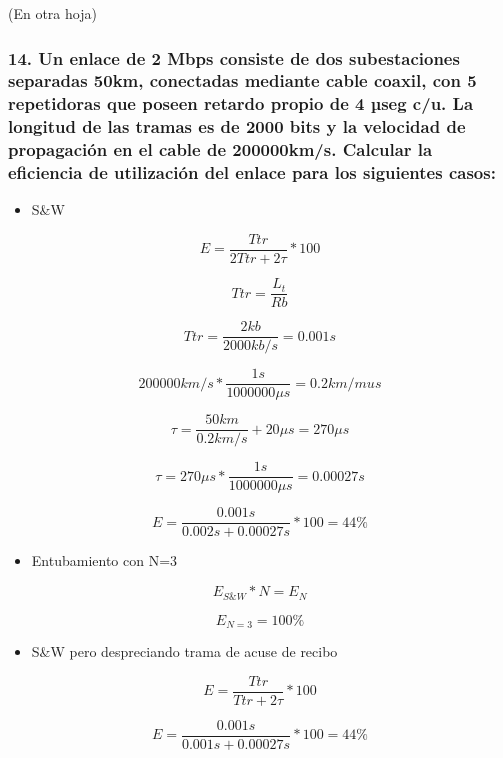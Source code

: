 \documentclass{article}
\begin{document}
(En otra hoja)

\subsubsection{14. Un enlace de 2 Mbps consiste de dos subestaciones
separadas 50km, conectadas mediante cable coaxil, con 5 repetidoras que
poseen retardo propio de 4 µseg c/u. La longitud de las tramas es de
2000 bits y la velocidad de propagación en el cable de 200000km/s.
Calcular la eficiencia de utilización del enlace para los siguientes
casos:}\label{un-enlace-de-2-mbps-consiste-de-dos-subestaciones-separadas-50km-conectadas-mediante-cable-coaxil-con-5-repetidoras-que-poseen-retardo-propio-de-4-uxb5seg-cu.-la-longitud-de-las-tramas-es-de-2000-bits-y-la-velocidad-de-propagaciuxf3n-en-el-cable-de-200000kms.-calcular-la-eficiencia-de-utilizaciuxf3n-del-enlace-para-los-siguientes-casos}

\begin{itemize}
\itemsep1pt\parskip0pt
\item
  S\&W
\end{itemize}

\[ E = \dfrac{Ttr}{2Ttr + 2\tau} * 100 \]

\[ Ttr = \dfrac{L_t}{Rb} \]

\[ Ttr = \dfrac{2kb}{2000kb/s} = 0.001s \]

\[ 200000km/s * \dfrac{1s}{1000000\mu s} = 0.2km/mu s \]

\[ \tau = \dfrac{50km}{0.2km/s} + 20\mu s = 270\mu s \]

\[ \tau = 270 \mu s * \dfrac{1s}{1000000\mu s} = 0.00027s \]

\[ E = \dfrac{0.001s}{0.002s + 0.00027s} * 100 = 44\% \]

\begin{itemize}
\itemsep1pt\parskip0pt
\item
  Entubamiento con N=3
\end{itemize}

\[ E_{S\&W} * N = E_{N} \]

\[ E_{N=3} = 100\% \]

\begin{itemize}
\itemsep1pt\parskip0pt
\item
  S\&W pero despreciando trama de acuse de recibo
\end{itemize}

\[ E = \dfrac{Ttr}{Ttr + 2\tau} * 100 \]

\[ E = \dfrac{0.001s}{0.001s + 0.00027s} * 100 = 44\% \]
\end{document}
